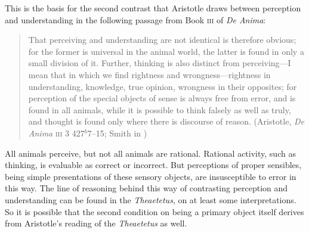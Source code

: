 \documentclass[12pt]{article}
\begin{document}
This is the basis for the second contrast that Aristotle draws between perception and understanding in the following passage from Book \textsc{iii} of \emph{De Anima}:
\begin{quote}
	That perceiving and understanding are not identical is therefore obvious; for the former is universal in the animal world, the latter is found in only a small division of it. Further, thinking is also distinct from perceiving---I mean that in which we find rightness and wrongness---right\-ness in understanding, knowledge, true opinion, wrongness in their opposites; for perception of the special objects of sense is always free from error, and is found in all animals, while it is possible to think falsely as well as truly, and thought is found only where there is discourse of reason. (Aristotle, \emph{De Anima} \textsc{iii} 3 427\( ^{b} \)7--15; Smith in \citealt[49]{Barnes:1984uq})
\end{quote}
All animals perceive, but not all animals are rational. Rational activity, such as thinking, is evaluable as correct or incorrect. But perceptions of proper sensibles, being simple presentations of these sensory objects, are insusceptible to error in this way. The line of reasoning behind this way of contrasting perception and understanding can be found in the \emph{Theaetetus}, on at least some interpretations. So it is possible that the second condition on being a primary object itself derives from Aristotle's reading of the \emph{Theaetetus} as well.
\end{document}
